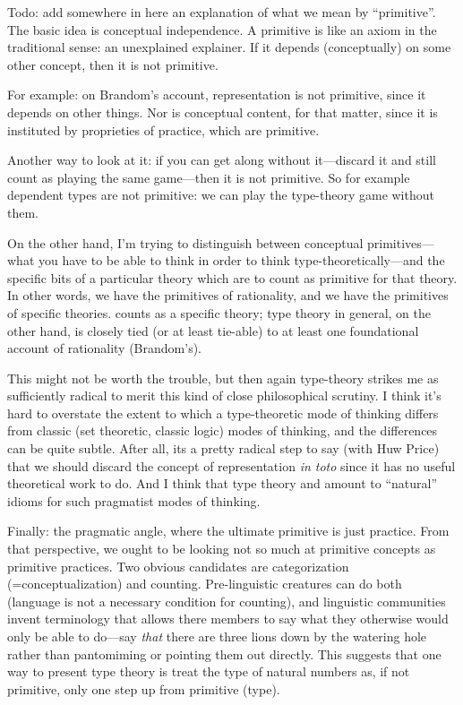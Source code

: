 \begin{ednote}
  Todo: add somewhere in here an explanation of what we mean by
  ``primitive''.  The basic idea is conceptual independence.  A
  primitive is like an axiom in the traditional sense: an unexplained
  explainer.  If it depends (conceptually) on some other concept, then
  it is not primitive.

  For example: on Brandom's account, representation is not primitive,
  since it depends on other things.  Nor is conceptual content, for
  that matter, since it is instituted by proprieties of practice,
  which are primitive.

  Another way to look at it: if you can get along without it---discard
  it and still count as playing the same game---then it is not
  primitive.  So for example dependent types are not primitive: we can
  play the type-theory game without them.

  On the other hand, I'm trying to distinguish between conceptual
  primitives---what you have to be able to think in order to think
  type-theoretically---and the specific bits of a particular theory
  which are to count as primitive for that theory.  In other words, we
  have the primitives of rationality, and we have the primitives of
  specific theories.  \HoTT{} counts as a specific theory; type theory in
  general, on the other hand, is closely tied (or at least tie-able)
  to at least one foundational account of rationality (Brandom's).

  This might not be worth the trouble, but then again type-theory
  strikes me as sufficiently radical to merit this kind of close
  philosophical scrutiny.  I think it's hard to overstate the extent
  to which a type-theoretic mode of thinking differs from classic (set
  theoretic, classic logic) modes of thinking, and the differences can
  be quite subtle.  After all, its a pretty radical step to say (with
  Huw Price\citep{price_naturalism_2010}) that we should
  discard the concept of representation \textit{in toto} since it has
  no useful theoretical work to do.  And I think that type theory and
  \HoTT{} amount to ``natural'' idioms for such pragmatist modes of
  thinking.

  Finally: the pragmatic angle, where the ultimate primitive is just
  practice.  From that perspective, we ought to be looking not so much
  at primitive concepts as primitive practices.  Two obvious
  candidates are categorization (=conceptualization) and counting.
  Pre-linguistic creatures can do both (language is not a necessary
  condition for counting), and linguistic communities invent
  terminology that allows there members to say what they otherwise
  would only be able to do---say \textit{that} there are three lions
  down by the watering hole rather than pantomiming or pointing them
  out directly.  This suggests that one way to present type theory is
  treat the type of natural numbers as, if not primitive, only one
  step up from primitive (type).
\end{ednote}

